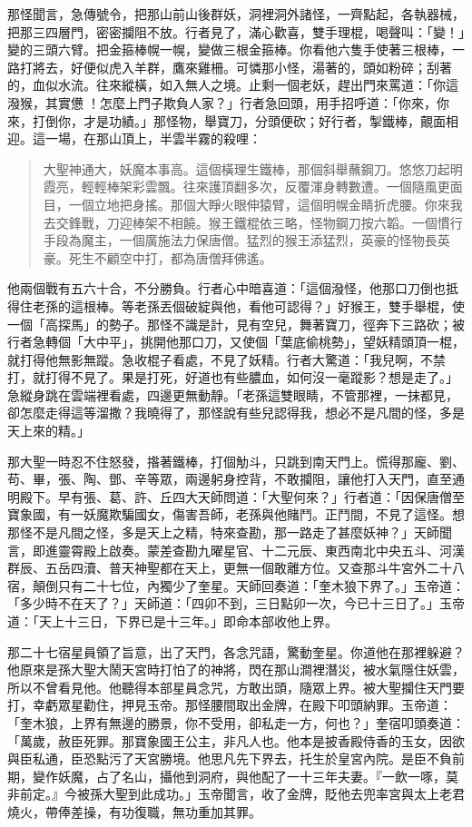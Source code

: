 那怪聞言，急傳號令，把那山前山後群妖，洞裡洞外諸怪，一齊點起，各執器械，把那三四層門，密密攔阻不放。行者見了，滿心歡喜，雙手理棍，喝聲叫：「變！」變的三頭六臂。把金箍棒幌一幌，變做三根金箍棒。你看他六隻手使著三根棒，一路打將去，好便似虎入羊群，鷹來雞柵。可憐那小怪，湯著的，頭如粉碎；刮著的，血似水流。往來縱橫，如入無人之境。止剩一個老妖，趕出門來罵道：「你這潑猴，其實憊𪬯！怎麼上門子欺負人家？」行者急回頭，用手招呼道：「你來，你來，打倒你，才是功績。」那怪物，舉寶刀，分頭便砍；好行者，掣鐵棒，覿面相迎。這一場，在那山頂上，半雲半霧的殺哩：
\begin{quote}
大聖神通大，妖魔本事高。這個橫理生鐵棒，那個斜舉蘸鋼刀。悠悠刀起明霞亮，輕輕棒架彩雲飄。往來護頂翻多次，反覆渾身轉數遭。一個隨風更面目，一個立地把身搖。那個大睜火眼伸猿臂，這個明幌金睛折虎腰。你來我去交鋒戰，刀迎棒架不相饒。猴王鐵棍依三略，怪物鋼刀按六韜。一個慣行手段為魔主，一個廣施法力保唐僧。猛烈的猴王添猛烈，英豪的怪物長英豪。死生不顧空中打，都為唐僧拜佛遙。
\end{quote}

他兩個戰有五六十合，不分勝負。行者心中暗喜道：「這個潑怪，他那口刀倒也抵得住老孫的這根棒。等老孫丟個破綻與他，看他可認得？」好猴王，雙手舉棍，使一個「高探馬」的勢子。那怪不識是計，見有空兒，舞著寶刀，徑奔下三路砍；被行者急轉個「大中平」，挑開他那口刀，又使個「葉底偷桃勢」，望妖精頭頂一棍，就打得他無影無蹤。急收棍子看處，不見了妖精。行者大驚道：「我兒啊，不禁打，就打得不見了。果是打死，好道也有些膿血，如何沒一毫蹤影？想是走了。」急縱身跳在雲端裡看處，四邊更無動靜。「老孫這雙眼睛，不管那裡，一抹都見，卻怎麼走得這等溜撒？我曉得了，那怪說有些兒認得我，想必不是凡間的怪，多是天上來的精。」

那大聖一時忍不住怒發，揝著鐵棒，打個觔斗，只跳到南天門上。慌得那龐、劉、苟、畢，張、陶、鄧、辛等眾，兩邊躬身控背，不敢攔阻，讓他打入天門，直至通明殿下。早有張、葛、許、丘四大天師問道：「大聖何來？」行者道：「因保唐僧至寶象國，有一妖魔欺騙國女，傷害吾師，老孫與他賭鬥。正鬥間，不見了這怪。想那怪不是凡間之怪，多是天上之精，特來查勘，那一路走了甚麼妖神？」天師聞言，即進靈霄殿上啟奏。蒙差查勘九曜星官、十二元辰、東西南北中央五斗、河漢群辰、五岳四瀆、普天神聖都在天上，更無一個敢離方位。又查那斗牛宮外二十八宿，顛倒只有二十七位，內獨少了奎星。天師回奏道：「奎木狼下界了。」玉帝道：「多少時不在天了？」天師道：「四卯不到，三日點卯一次，今已十三日了。」玉帝道：「天上十三日，下界已是十三年。」即命本部收他上界。

那二十七宿星員領了旨意，出了天門，各念咒語，驚動奎星。你道他在那裡躲避？他原來是孫大聖大鬧天宮時打怕了的神將，閃在那山澗裡潛災，被水氣隱住妖雲，所以不曾看見他。他聽得本部星員念咒，方敢出頭，隨眾上界。被大聖攔住天門要打，幸虧眾星勸住，押見玉帝。那怪腰間取出金牌，在殿下叩頭納罪。玉帝道：「奎木狼，上界有無邊的勝景，你不受用，卻私走一方，何也？」奎宿叩頭奏道：「萬歲，赦臣死罪。那寶象國王公主，非凡人也。他本是披香殿侍香的玉女，因欲與臣私通，臣恐點污了天宮勝境。他思凡先下界去，托生於皇宮內院。是臣不負前期，變作妖魔，占了名山，攝他到洞府，與他配了一十三年夫妻。『一飲一啄，莫非前定。』今被孫大聖到此成功。」玉帝聞言，收了金牌，貶他去兜率宮與太上老君燒火，帶俸差操，有功復職，無功重加其罪。

